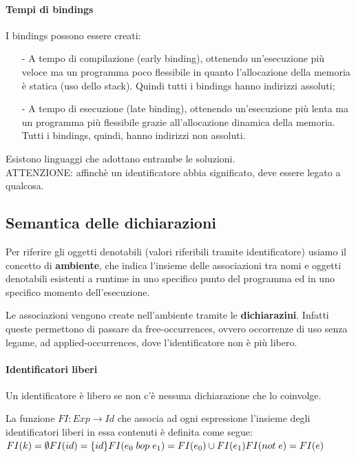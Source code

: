 \documentclass[a4paper, 10pt]{report}
\begin{document}
\paragraph*{Tempi di bindings} I bindings possono essere creati:
\begin{itemize}
\item[-] A tempo di compilazione (early binding), ottenendo un'esecuzione più veloce ma un programma poco flessibile in quanto l'allocazione della memoria è statica (uso dello stack). Quindi tutti  i bindings hanno indirizzi assoluti;
\item[-] A tempo di esecuzione (late binding), ottenendo un'esecuzione più lenta ma un programma più flessibile grazie all'allocazione dinamica della memoria. Tutti i bindings, quindi, hanno indirizzi non assoluti.
\end{itemize}
Esistono linguaggi che adottano entrambe le soluzioni.\\

\noindent ATTENZIONE: affinchè un identificatore abbia significato, deve essere legato a qualcosa.

\subsection*{Semantica delle dichiarazioni}
Per riferire gli oggetti denotabili (valori riferibili tramite identificatore) usiamo il concetto di \textbf{ambiente}, che indica l'insieme delle associazioni tra nomi e oggetti denotabili esistenti a runtime in uno specifico punto del programma ed in uno specifico momento dell'esecuzione.

Le associazioni vengono create nell'ambiente tramite le \textbf{dichiarazini}. Infatti queste permettono di passare da free-occurrences, ovvero occorrenze di uso senza legame, ad applied-occurrences, dove l'identificatore non è più libero.

\paragraph*{Identificatori liberi} Un identificatore è libero se non c'è nessuna dichiarazione che lo coinvolge. 
\begin{tcolorbox}[title=\textbf{Definizione per induzione}]
La funzione $FI : Exp \rightarrow Id$ che associa ad ogni espressione l'insieme degli identificatori liberi in essa contenuti è definita come segue:\\
$
FI(k) = \emptyset\\
FI(id) = \{id\}\\
FI(e_0 \hspace{0.1cm} bop \hspace{0.1cm} e_1) = FI(e_0)\cup FI(e_1)\\
FI(not \hspace{0.1cm} e) = FI(e)
$
\end{tcolorbox}
\end{document}

